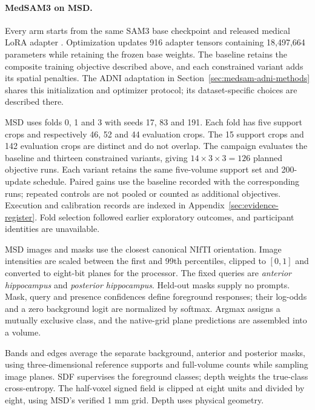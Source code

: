 \documentclass[12pt,a4paper]{article}
\begin{document}
\paragraph{MedSAM3 on MSD.}
\label{sec:medsam-methods}


Every arm starts from the same SAM3 base checkpoint and released medical
LoRA adapter \cite{carion2025sam3,liu2025medsam3}. Optimization updates
916 adapter tensors containing 18,497,664 parameters while retaining
the frozen base weights. The baseline retains the composite training objective described above,
and each constrained variant adds its spatial penalties. The ADNI adaptation in
Section~\ref{sec:medsam-adni-methods} shares this initialization and
optimizer protocol; its dataset-specific choices are described there.

MSD uses folds 0, 1 and 3 with seeds 17, 83 and 191. Each fold has five
support crops and respectively 46, 52 and 44 evaluation crops. The 15
support crops and 142 evaluation crops are distinct and do not overlap.
The campaign evaluates the baseline and thirteen constrained variants,
giving $14\times3\times3=126$ planned objective runs. Each variant
retains the same five-volume support set and 200-update schedule.
Paired gains use the baseline recorded with the corresponding runs;
repeated controls are not pooled or counted as additional objectives.
Execution and calibration records are indexed in
Appendix~\ref{sec:evidence-register}. Fold selection followed earlier
exploratory outcomes, and participant identities are unavailable.

MSD images and masks use the closest canonical NIfTI orientation.
Image intensities are scaled
between the first and 99th percentiles, clipped to $[0,1]$ and converted
to eight-bit planes for the processor. The fixed queries are
\emph{anterior hippocampus} and \emph{posterior hippocampus}.
Held-out masks supply no prompts.
Mask, query and presence confidences define foreground responses;
their log-odds and a zero background logit are normalized by softmax.
Argmax assigns a mutually exclusive class, and the native-grid plane
predictions are assembled into a volume.


Bands and edges average the separate background, anterior and
posterior masks, using three-dimensional reference supports and
full-volume counts while sampling image planes. SDF supervises the
foreground classes; depth weights the true-class cross-entropy.
The half-voxel signed field is clipped at eight units and divided by
eight, using MSD's verified 1 mm grid. Depth uses physical geometry.
\end{document}
